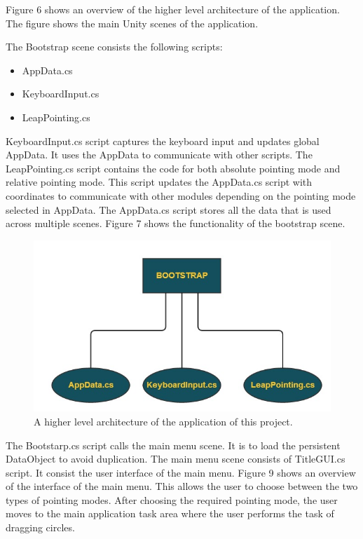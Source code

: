 \documentclass[titlepage]{article}
\begin{document}
Figure 6 shows an overview of the higher level architecture of the application. The figure shows the main Unity scenes of the application.

The Bootstrap scene consists the following scripts:

\begin{itemize}
    \item AppData.cs
    \item KeyboardInput.cs
    \item LeapPointing.cs
\end{itemize}

KeyboardInput.cs script captures the keyboard input and updates global AppData. It uses the AppData to communicate with other scripts. The LeapPointing.cs script contains the code for both absolute pointing mode and relative pointing mode. This script updates the AppData.cs script with coordinates to communicate with other modules depending on the pointing mode selected in AppData. The AppData.cs script stores all the data that is used across multiple scenes. Figure 7 shows the functionality of the bootstrap scene.

\begin{figure}[!h]
\centering
\includegraphics[width=4.5in]{Figure_7}
\caption{A higher level architecture of the application of this project.}
\end{figure}


The Bootstarp.cs script calls the main menu scene. It is to load the persistent DataObject to avoid duplication. The main menu scene consists of TitleGUI.cs script. It consist the user interface of the main menu. Figure 9 shows an overview of the interface of the main menu. This allows the user to choose between the two types of pointing modes. After choosing the required pointing mode, the user moves to the main application task area where the user performs the task of dragging circles.
\end{document}

